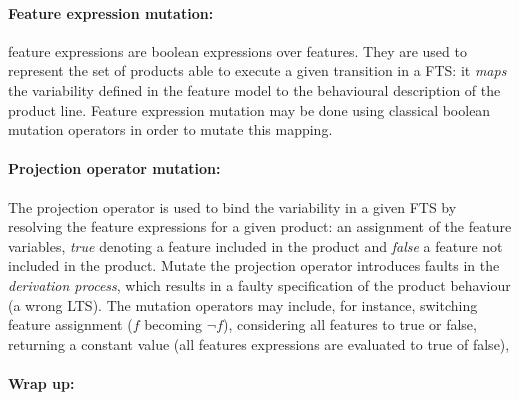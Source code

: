 \paragraph{Feature expression mutation:}

\Glspl{feature expression} are boolean expressions over features. They are used to represent the set of products able to execute a given transition in a FTS: it \emph{maps} the variability defined in the feature model to the behavioural description of the product line. Feature expression mutation may be done using classical boolean mutation operators \cite{Mathur2008} in order to mutate this mapping.

\paragraph{Projection operator mutation:}

The projection operator is used to bind the variability in a given FTS by resolving the feature expressions for a given product: \ie an assignment of the feature variables, \textit{true} denoting a feature included in the product and \textit{false} a feature not included in the product. Mutate the projection operator introduces faults in the \emph{derivation process}, which results in a faulty specification of the product behaviour (\ie a wrong LTS). The mutation operators may include, for instance, switching feature assignment ($f$ becoming $\neg f$), considering all features to true or false, returning a constant value (all features expressions are evaluated to true of false), \etc

\paragraph{Wrap up:}

